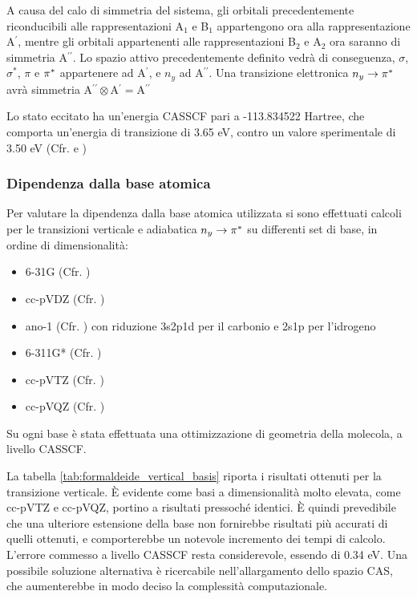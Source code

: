 A causa del calo di simmetria del sistema, gli orbitali precedentemente
riconducibili alle rappresentazioni A$_1$ e B$_1$ appartengono ora alla
rappresentazione A$^{\prime}$, mentre gli orbitali appartenenti alle 
rappresentazioni B$_2$ e A$_2$ ora saranno di simmetria A$^{\prime\prime}$.
Lo spazio attivo precedentemente definito vedr\`a di conseguenza, 
$\sigma$, $\sigma^{*}$, $\pi$ e $\pi^{*}$ appartenere ad A$^{\prime}$,
e $n_y$ ad A$^{\prime\prime}$. Una transizione elettronica $n_y \rightarrow
\pi^{*}$ avr\`a simmetria A$^{\prime\prime} \otimes $A$^{\prime} =
$A$^{\prime\prime}$

Lo stato eccitato ha un'energia CASSCF pari a -113.834522
Hartree, che comporta un'energia di transizione di 3.65 eV, contro un valore
sperimentale di 3.50 eV (Cfr. \cite{jpc-97-17-1993-4293} e \cite{sa-34a-1978-749})

\subsubsection{Dipendenza dalla base atomica}

Per valutare la dipendenza dalla base atomica utilizzata si sono effettuati calcoli per
le transizioni verticale e adiabatica $ n_y \rightarrow \pi^{*} $ su differenti 
set di base, in ordine di dimensionalit\`a:
\begin{itemize}
 \item 6-31G (Cfr. \cite{mp-27-1974-209})
 \item cc-pVDZ (Cfr. \cite{jcp-90-1989-1007})
 \item ano-1 (Cfr. \cite{jcp-55-1971-4798}) con riduzione 3s2p1d per il carbonio e 2s1p per l'idrogeno
 \item 6-311G* (Cfr. \cite{jcp-72-1980-5639})
 \item cc-pVTZ (Cfr. \cite{jcp-90-1989-1007})
 \item cc-pVQZ (Cfr. \cite{jcp-90-1989-1007})
\end{itemize}
Su ogni base \`e stata effettuata una ottimizzazione di geometria della
molecola, a livello CASSCF.

La tabella \ref{tab:formaldeide_vertical_basis} riporta i risultati ottenuti
per la transizione verticale. \`E evidente come basi a dimensionalit\`a molto
elevata, come cc-pVTZ e cc-pVQZ, portino a risultati pressoch\'e identici.
\`E quindi prevedibile che una ulteriore estensione della base non fornirebbe
risultati pi\`u accurati di quelli ottenuti, e comporterebbe un notevole incremento
dei tempi di calcolo. L'errore commesso a livello CASSCF resta
considerevole, essendo di 0.34 eV.  Una possibile soluzione alternativa \`e
ricercabile nell'allargamento dello spazio CAS, che aumenterebbe in modo
deciso la complessit\`a computazionale.

